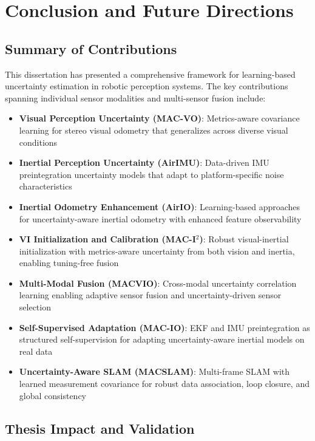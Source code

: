 \chapter{Conclusion and Future Directions} \label{chapter:conclusion}

\section{Summary of Contributions}

This dissertation has presented a comprehensive framework for learning-based uncertainty estimation in robotic perception systems. The key contributions spanning individual sensor modalities and multi-sensor fusion include:

\begin{itemize}
    \item \textbf{Visual Perception Uncertainty (MAC-VO)}: Metrics-aware covariance learning for stereo visual odometry that generalizes across diverse visual conditions
    \item \textbf{Inertial Perception Uncertainty (AirIMU)}: Data-driven IMU preintegration uncertainty models that adapt to platform-specific noise characteristics
    \item \textbf{Inertial Odometry Enhancement (AirIO)}: Learning-based approaches for uncertainty-aware inertial odometry with enhanced feature observability
    \item \textbf{VI Initialization and Calibration (MAC-I$^2$)}: Robust visual-inertial initialization with metrics-aware uncertainty from both vision and inertia, enabling tuning-free fusion
    \item \textbf{Multi-Modal Fusion (MACVIO)}: Cross-modal uncertainty correlation learning enabling adaptive sensor fusion and uncertainty-driven sensor selection
    \item \textbf{Self-Supervised Adaptation (MAC-IO)}: EKF and IMU preintegration as structured self-supervision for adapting uncertainty-aware inertial models on real data
    \item \textbf{Uncertainty-Aware SLAM (MACSLAM)}: Multi-frame SLAM with learned measurement covariance for robust data association, loop closure, and global consistency
\end{itemize}

\section{Thesis Impact and Validation}

